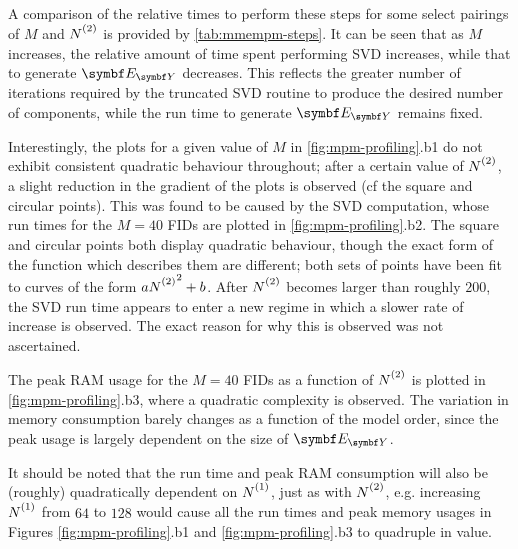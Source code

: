 A comparison of the relative times to perform these steps for some select
pairings of $M$ and $\Ntwo$ is provided by \cref{tab:mmempm-steps}. It can be
seen that as $M$ increases, the relative amount of time spent performing
\ac{SVD} increases, while that to generate $\EY$ decreases. This
reflects the greater number of iterations required by
the truncated \ac{SVD} routine\cite{svds} to produce the desired number of
components, while the run time to generate $\EY$ remains fixed.

Interestingly, the plots for a given value of $M$ in
\cref{fig:mpm-profiling}.b1 do not exhibit
consistent quadratic behaviour throughout; after a certain value of $\Ntwo$, a
slight reduction in the gradient of the plots is observed (cf
the square and circular points). This was found to be caused by the \ac{SVD}
computation, whose run times for the $M=40$ \acp{FID} are plotted in
\cref{fig:mpm-profiling}.b2.
The square and circular points both display quadratic behaviour, though the
exact form of the function which
describes them are different; both sets of points have been fit to curves of
the form $a\Ntwo^2 + b$. After $\Ntwo$ becomes larger than
roughly $200$, the \ac{SVD} run time appears to enter a new regime in which
a slower rate of increase is observed. The exact reason for why this is
observed was not ascertained.

The peak \ac{RAM} usage for the $M=40$ \acp{FID} as a function of $\Ntwo$ is
plotted in \cref{fig:mpm-profiling}.b3, where a quadratic complexity is
observed. The variation in memory consumption barely changes as a function of
the model order, since the peak usage is largely dependent on the size of
$\EY$.

It should be noted that the run time and peak \ac{RAM} consumption will also be
(roughly) quadratically dependent on $\None$, just as with $\Ntwo$, e.g.
increasing  $\None$ from  $64$ to $128$ would cause all the run times and peak
memory usages in Figures \ref{fig:mpm-profiling}.b1 and
\ref{fig:mpm-profiling}.b3 to quadruple in value.


